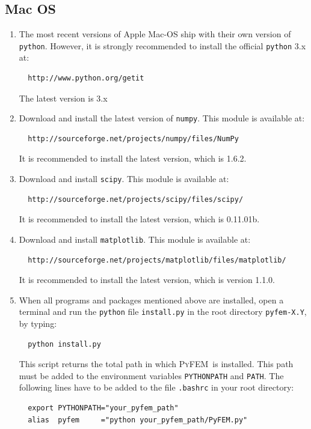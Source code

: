 \documentclass{article}
\newcommand{\progname}{\textsc{PyFEM}}
\begin{document}
\subsection{Mac OS}

\begin{enumerate}
\item The most recent versions of Apple Mac-OS ship with their own version of \texttt{python}. However, it is 
strongly recommended to install the official \texttt{python} 3.x at: 
\begin{verbatim}
  http://www.python.org/getit
\end{verbatim} 
The latest version is 3.x
\item Download and install the latest version of \texttt{numpy}.
This module is available at:
\begin{verbatim}
  http://sourceforge.net/projects/numpy/files/NumPy
\end{verbatim}
It is recommended to install the latest version, which is 1.6.2.
\item Download and install \texttt{scipy}.
This module is available at:
\begin{verbatim}
  http://sourceforge.net/projects/scipy/files/scipy/
\end{verbatim}
It is recommended to install the latest version, which is 0.11.01b.
\item Download and install \texttt{matplotlib}.
This module is available at:
\begin{verbatim}
  http://sourceforge.net/projects/matplotlib/files/matplotlib/
\end{verbatim}
It is recommended to install the latest version, which is version 1.1.0.
\item When all programs and packages mentioned above are installed, open a terminal and run 
the \texttt{python} file \texttt{install.py} in the root directory \texttt{pyfem-X.Y}, by typing:
\begin{verbatim}
  python install.py
\end{verbatim}
This script returns the total path in which \progname~is installed. This path must be 
added to the environment variables \texttt{PYTHONPATH} and \texttt{PATH}. The following lines 
have to be added to the file \texttt{.bashrc} in your root directory:
\begin{verbatim}
  export PYTHONPATH="your_pyfem_path"
  alias  pyfem     ="python your_pyfem_path/PyFEM.py"
\end{verbatim}
\end{enumerate}
\end{document}
